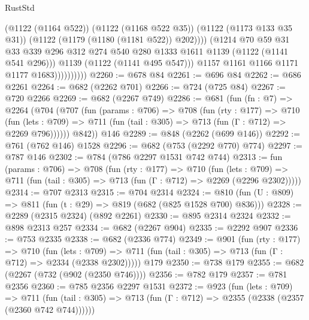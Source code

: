 \begin{lexlean}{RustStd}
\begin{coremodule}
                              (@1122 (@1164 @522))
                              (@1122 (@1168 @522 @35))
                              (@1122 (@1173 @133 @35 @31))
                              (@1122 (@1179 (@1180 (@1181 @522)) @202))))
                          (@1214
                            @70
                            @59
                            @31
                            @33
                            @339
                            @296
                            @312
                            @274
                            @540
                            @280
                            @1333
                            @1611
                            @1139
                            (@1122 (@1141 @541 @296)))
                          @1139
                          (@1122 (@1141 @495 @547)))
                        @1157
                        @1161
                        @1166
                        @1171
                        @1177
                        @1683))))))))))
@2260 := @678 @84
@2261 := @696 @84
@2262 := @686 @2261
@2264 := @682 (@2262 @701)
@2266 := @724 (@725 @84)
@2267 := @720 @2266
@2269 := @682 (@2267 @749)
@2286 := @681
    (fun (fn : @7) =>
    @2264
      (@704
        (@707
          (fun (params : @706) =>
          @708
            (fun (rty : @177) =>
            @710
              (fun (lets : @709) =>
              @711 (fun (tail : @305) => @713 (fun (Γ : @712) => @2269 @796))))))
        @842))
    @146
@2289 := @848 (@2262 (@699 @146))
@2292 := @761 (@762 @146) @1528
@2296 := @682 (@753 (@2292 @770) @774)
@2297 := @787 @146
@2302 := @784 (@786 @2297 @1531 @742 @744)
@2313 := fun (params : @706) =>
  @708
    (fun (rty : @177) =>
    @710
      (fun (lets : @709) =>
      @711 (fun (tail : @305) => @713 (fun (Γ : @712) => @2269 (@2296 @2302)))))
@2314 := @707 @2313
@2315 := @704 @2314
@2324 := @810 (fun (U : @809) => @811 (fun (t : @29) => @819 (@682 (@825 @1528 @700) @836)))
@2328 := @2289 (@2315 @2324) (@892 @2261)
@2330 := @895 @2314 @2324
@2332 := @898 @2313 @257
@2334 := @682 (@2267 @904)
@2335 := @2292 @907
@2336 := @753 @2335
@2338 := @682 (@2336 @774)
@2349 := @901
    (fun (rty : @177) =>
    @710
      (fun (lets : @709) =>
      @711 (fun (tail : @305) => @713 (fun (Γ : @712) => @2334 (@2338 @2302)))))
    @179
@2350 := @738 @179
@2355 := @682 (@2267 (@732 (@902 (@2350 @746))))
@2356 := @782 @179
@2357 := @781 @2356
@2360 := @785 @2356 @2297 @1531
@2372 := @923
    (fun (lets : @709) =>
    @711 (fun (tail : @305) => @713 (fun (Γ : @712) => @2355 (@2338 (@2357 (@2360 @742 @744))))))

\end{coremodule}
\end{lexlean}
